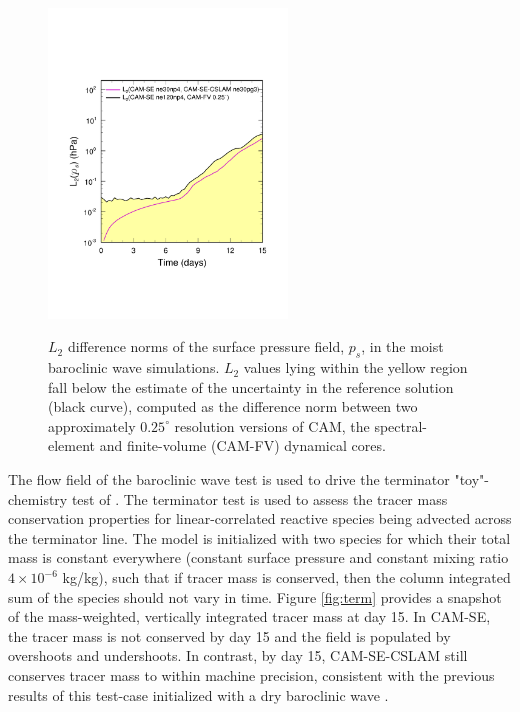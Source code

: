 \documentclass[twocol]{ametsoc}
\begin{document}
\begin{figure}[t]
\begin{center}
\noindent\includegraphics[width=15pc,angle=0]{figs/temp_l2.pdf}\\
\end{center}
\caption{$L_2$ difference norms of the surface pressure field, $p_s$, in the moist baroclinic wave simulations. $L_2$ values lying within the yellow region fall below the estimate of the uncertainty in the reference solution (black curve), computed as the difference norm between two approximately $0.25^\circ$ resolution versions of CAM, the spectral-element and finite-volume (CAM-FV) dynamical cores.}
\label{fig:norm}
\end{figure}

{\color{red}The flow field of the baroclinic wave test is used to drive the terminator "toy"-chemistry test of \cite{LCLVT2015GMD}. The terminator test is used to assess the tracer mass conservation properties for linear-correlated reactive species being advected across the terminator line. The model is initialized with two species for which their total mass is constant everywhere (constant surface pressure and constant mixing ratio $4\times 10^{-6}$ kg/kg), such that if tracer mass is conserved, then the column integrated sum of the species should not vary in time. Figure \ref{fig:term} provides a snapshot of the mass-weighted, vertically integrated tracer mass at day 15. In CAM-SE, the tracer mass is not conserved by day 15 and the field is populated by overshoots and undershoots. In contrast, by day 15, CAM-SE-CSLAM still conserves tracer mass to within machine precision, consistent with the previous results of this test-case initialized with a dry baroclinic wave \citep{LTOUNGK2017MWR}.{}} 
\end{document}
